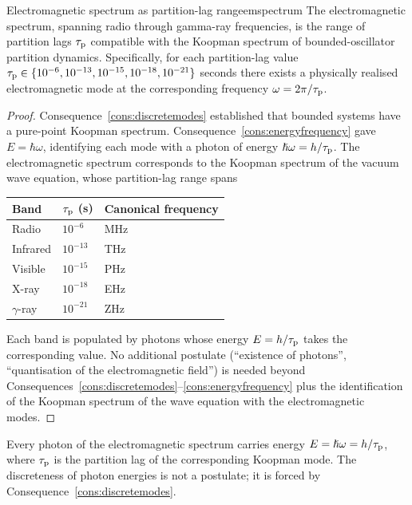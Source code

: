 \begin{consequence}{Electromagnetic spectrum as partition-lag range}{emspectrum}
The electromagnetic spectrum, spanning radio through gamma-ray frequencies, is the range of partition lags $\tau_{\mathrm{p}}$ compatible with the Koopman spectrum of bounded-oscillator partition dynamics. Specifically, for each partition-lag value $\tau_{\mathrm{p}}\in\{10^{-6}, 10^{-13}, 10^{-15}, 10^{-18}, 10^{-21}\}$ seconds there exists a physically realised electromagnetic mode at the corresponding frequency $\omega=2\pi/\tau_{\mathrm{p}}$.
\end{consequence}

\begin{proof}
Consequence~\ref{cons:discretemodes} established that bounded systems have a pure-point Koopman spectrum. Consequence~\ref{cons:energyfrequency} gave $E=\hbar\omega$, identifying each mode with a photon of energy $\hslash\omega=h/\tau_{\mathrm{p}}$. The electromagnetic spectrum corresponds to the Koopman spectrum of the vacuum wave equation, whose partition-lag range spans
\begin{center}
\begin{tabular}{lll}
\toprule
Band & $\tau_{\mathrm{p}}$ (s) & Canonical frequency \\
\midrule
Radio       & $10^{-6}$  & MHz \\
Infrared    & $10^{-13}$ & THz \\
Visible     & $10^{-15}$ & PHz \\
X-ray       & $10^{-18}$ & EHz \\
$\gamma$-ray & $10^{-21}$ & ZHz \\
\bottomrule
\end{tabular}
\end{center}
Each band is populated by photons whose energy $E=h/\tau_{\mathrm{p}}$ takes the corresponding value. No additional postulate (``existence of photons'', ``quantisation of the electromagnetic field'') is needed beyond Consequences~\ref{cons:discretemodes}--\ref{cons:energyfrequency} plus the identification of the Koopman spectrum of the wave equation with the electromagnetic modes.
\end{proof}

\begin{corollary}\label{cor:photontaup}
Every photon of the electromagnetic spectrum carries energy $E=\hslash\omega=h/\tau_{\mathrm{p}}$, where $\tau_{\mathrm{p}}$ is the partition lag of the corresponding Koopman mode. The discreteness of photon energies is not a postulate; it is forced by Consequence~\ref{cons:discretemodes}.
\end{corollary}

